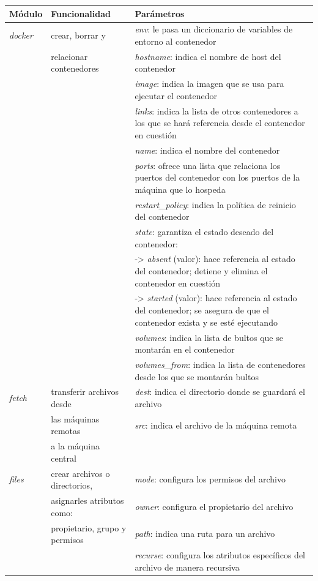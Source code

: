 \documentclass[a4paper,12pt]{article}
\begin{document}
{\begin{center}
\begin{tabulary}{\textwidth}{l|l|L}
\hline
Módulo & Funcionalidad & Parámetros\\
\hline
\emph{docker} & crear, borrar y & \emph{env}: le pasa un diccionario de variables de entorno al contenedor\\
 & relacionar contenedores & \emph{hostname}: indica el nombre de host del contenedor\\
 &  & \emph{image}: indica la imagen que se usa para ejecutar el contenedor\\
 &  & \emph{links}: indica la lista de otros contenedores a los que se hará referencia desde el contenedor en cuestión\\
 &  & \emph{name}: indica el nombre del contenedor\\
 &  & \emph{ports}: ofrece una lista que relaciona los puertos del contenedor con los puertos de la máquina que lo hospeda\\
 &  & \emph{restart\_policy}: indica la política de reinicio del contenedor\\
 &  & \emph{state}: garantiza el estado deseado del contenedor:\\
 &  & -> \emph{absent} (valor): hace referencia al estado del contenedor; detiene y elimina el contenedor en cuestión\\
 &  & -> \emph{started} (valor): hace referencia al estado del contenedor; se asegura de que el contenedor exista y se esté ejecutando\\
 &  & \emph{volumes}: indica la lista de bultos que se montarán en el contenedor\\
 &  & \emph{volumes\_from}: indica la lista de contenedores desde los que se montarán bultos\\
\hline
\emph{fetch} & transferir archivos desde & \emph{dest}: indica el directorio donde se guardará el archivo\\
 & las máquinas remotas & \emph{src}: indica el archivo de la máquina remota\\
 & a la máquina central & \\
\hline
\emph{files} & crear archivos o directorios, & \emph{mode}: configura los permisos del archivo\\
 & asignarles atributos como: & \emph{owner}: configura el propietario del archivo\\
 & propietario, grupo y permisos & \emph{path}: indica una ruta para un archivo\\
 &  & \emph{recurse}: configura los atributos específicos del archivo de manera recursiva\\

\end{tabulary}
\end{center}}
\end{document}
